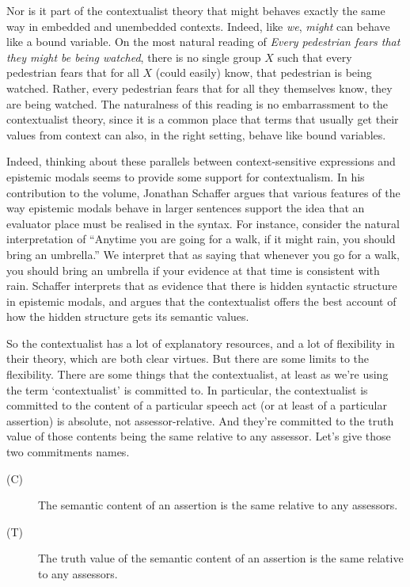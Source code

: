 Nor is it part of the contextualist theory that might behaves exactly the same way in embedded and unembedded contexts. Indeed, like \textit{we}, \textit{might} can behave like a bound variable. On the most natural reading of \textit{Every pedestrian fears that they might be being watched}, there is no single group $X$ such that every pedestrian fears that for all $X$ (could easily) know, that pedestrian is being watched. Rather, every pedestrian fears that for all they themselves know, they are being watched. The naturalness of this reading is no embarrassment to the contextualist theory, since it is a common place that terms that usually get their values from context can also, in the right setting, behave like bound variables.

Indeed, thinking about these parallels between context-sensitive expressions and epistemic modals seems to provide some support for contextualism. In his contribution to the volume, Jonathan Schaffer argues that various features of the way epistemic modals behave in larger sentences support the idea that an evaluator place must be realised in the syntax. For instance, consider the natural interpretation of ``Anytime you are going for a walk, if it might rain, you should bring an umbrella.'' We interpret that as saying that whenever you go for a walk, you should bring an umbrella if your evidence at that time is consistent with rain. Schaffer interprets that as evidence that there is hidden syntactic structure in epistemic modals, and argues that the contextualist offers the best account of how the hidden structure gets its semantic values.

So the contextualist has a lot of explanatory resources, and a lot of flexibility in their theory, which are both clear virtues. But there are some limits to the flexibility. There are some things that the contextualist, at least as we're using the term `contextualist' is committed to. In particular, the contextualist is committed to the content of a particular speech act (or at least of a particular assertion) is absolute, not assessor-relative. And they're committed to the truth value of those contents being the same relative to any assessor. Let's give those two commitments names.

\begin{description}
\item[(C)] The semantic content of an assertion is the same relative to any assessors.
\item[(T)] The truth value of the semantic content of an assertion is the same relative to any assessors.
\end{description}

